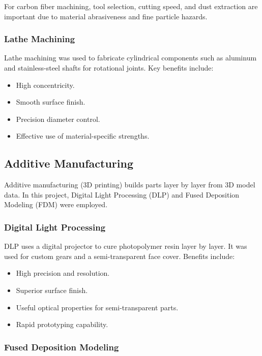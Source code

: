 For carbon fiber machining, tool selection, cutting speed, and dust extraction are important due to material abrasiveness and fine particle hazards.

\subsubsection*{Lathe Machining}

Lathe machining was used to fabricate cylindrical components such as aluminum and stainless-steel shafts for rotational joints. Key benefits include:
\begin{itemize}
    \item High concentricity.
    \item Smooth surface finish.
    \item Precision diameter control.
    \item Effective use of material-specific strengths.
\end{itemize}

\subsection{Additive Manufacturing}

Additive manufacturing (3D printing) builds parts layer by layer from 3D model data. In this project, Digital Light Processing (DLP) and Fused Deposition Modeling (FDM) were employed.

\subsubsection*{Digital Light Processing}

DLP uses a digital projector to cure photopolymer resin layer by layer. It was used for custom gears and a semi-transparent face cover. Benefits include:
\begin{itemize}
    \item High precision and resolution.
    \item Superior surface finish.
    \item Useful optical properties for semi-transparent parts.
    \item Rapid prototyping capability.
\end{itemize}

\subsubsection*{Fused Deposition Modeling}

